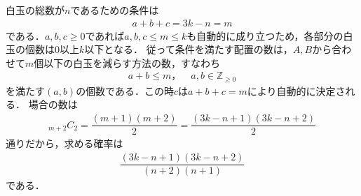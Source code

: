 \documentclass[../../main.tex]{subfiles}
\begin{document}
白玉の総数が$n$であるための条件は
\begin{align}
  a+b+c=3k-n=m
\end{align}
である．$a,b,c\ge0$であれば$a,b,c\le m\le k$も自動的に成り立つため，各部分の白玉の個数は$0$以上$k$以下となる．
従って条件を満たす配置の数は，$A,B$から合わせて$m$個以下の白玉を減らす方法の数，すなわち
\begin{align}
  a+b\le m，\quad a,b\in\mathbb{Z}_{\ge0}
\end{align}
を満たす$(a,b)$の個数である．この時$c$は$a+b+c=m$により自動的に決定される．
場合の数は
\begin{align}
  {}_{m+2}C_{2}
  =\dfrac{(m+1)(m+2)}{2}
  =\dfrac{(3k-n+1)(3k-n+2)}{2}
\end{align}
通りだから，求める確率は
\begin{align}
  \dfrac{(3k-n+1)(3k-n+2)}{(n+2)(n+1)}
\end{align}
である．




\end{document}
